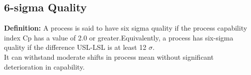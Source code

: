 \documentclass[../main.tex]{subfiles}
\begin{document}
\subsection{6-sigma Quality}
\textbf{Definition: }A process is said to have six sigma quality if the process capability index Cp has a value of 2.0 or greater.Equivalently, a process has six-sigma quality if the difference USL-LSL is at least 12 $\sigma$.\\
It can withstand moderate shifts in process mean without significant deterioration in capability.
\end{document}
